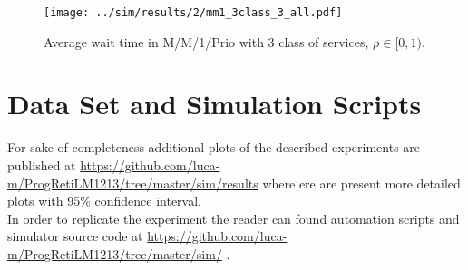 \documentclass{llncs}
\begin{document}
\begin{figure}
\centering
\texttt{[image: ../sim/results/2/mm1\_3class\_3\_all.pdf]}
\caption{Average wait time in M/M/1/Prio with 3 class of services, $\rho \in [0,1)$.}
\label{fig:mm1_3class_3_all}
\end{figure}
\newpage



\appendix

\section{Data Set and Simulation Scripts}
For sake of completeness additional plots of the described experiments are published at \url{https://github.com/luca-m/ProgRetiLM1213/tree/master/sim/results} where ere are present more detailed plots with 95\% confidence interval.\\
In order to replicate the experiment the reader can found automation scripts and simulator source code at \url{https://github.com/luca-m/ProgRetiLM1213/tree/master/sim/} .
\end{document}

